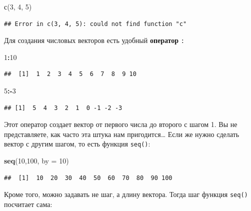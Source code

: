 \documentclass[]{book}
\newenvironment{Shaded}{\begin{snugshade}}{\end{snugshade}}
\newcommand{\DataTypeTok}[1]{\textcolor[rgb]{0.13,0.29,0.53}{#1}}
\newcommand{\DecValTok}[1]{\textcolor[rgb]{0.00,0.00,0.81}{#1}}
\newcommand{\KeywordTok}[1]{\textcolor[rgb]{0.13,0.29,0.53}{\textbf{#1}}}
\newcommand{\NormalTok}[1]{#1}
\newcommand{\OperatorTok}[1]{\textcolor[rgb]{0.81,0.36,0.00}{\textbf{#1}}}
\begin{document}
\begin{Shaded}
\begin{Highlighting}[]
\NormalTok{с(}\DecValTok{3}\NormalTok{, }\DecValTok{4}\NormalTok{, }\DecValTok{5}\NormalTok{)}
\end{Highlighting}
\end{Shaded}

\begin{verbatim}
## Error in с(3, 4, 5): could not find function "с"
\end{verbatim}

Для создания числовых векторов есть удобный \textbf{оператор} \texttt{:}

\begin{Shaded}
\begin{Highlighting}[]
\DecValTok{1}\OperatorTok{:}\DecValTok{10}
\end{Highlighting}
\end{Shaded}

\begin{verbatim}
##  [1]  1  2  3  4  5  6  7  8  9 10
\end{verbatim}

\begin{Shaded}
\begin{Highlighting}[]
\DecValTok{5}\OperatorTok{:-}\DecValTok{3}
\end{Highlighting}
\end{Shaded}

\begin{verbatim}
## [1]  5  4  3  2  1  0 -1 -2 -3
\end{verbatim}

Этот оператор создает вектор от первого числа до второго с шагом 1. Вы не представляете, как часто эта штука нам пригодится\ldots{} Если же нужно сделать вектор с другим шагом, то есть функция \texttt{seq()}:

\begin{Shaded}
\begin{Highlighting}[]
\KeywordTok{seq}\NormalTok{(}\DecValTok{10}\NormalTok{,}\DecValTok{100}\NormalTok{, }\DataTypeTok{by =} \DecValTok{10}\NormalTok{)}
\end{Highlighting}
\end{Shaded}

\begin{verbatim}
##  [1]  10  20  30  40  50  60  70  80  90 100
\end{verbatim}

Кроме того, можно задавать не шаг, а длину вектора. Тогда шаг функция \texttt{seq()} посчитает сама:
\end{document}
